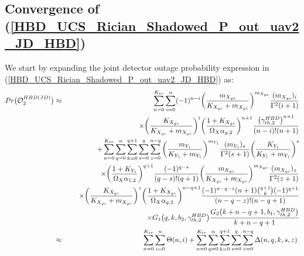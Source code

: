 \subsection{Convergence of (\ref{HBD_UCS_Rician_Shadowed_P_out_uav2_JD_HBD})} \label{HBD_UCS_Rician_Shadowed_P_out_uav2_JD_HBD_conv}
We start by expanding the joint detector outage probability expression in (\ref{HBD_UCS_Rician_Shadowed_P_out_uav2_JD_HBD}) as:
\begin{eqnarray} 
Pr\big(\mathcal{O}_{2}^{HBD(JD)}\big) & \approx & \sum_{n=0}^{K_{tr}} \sum_{i=0}^n (-1)^{n-i} \bigg(\frac{m_{X_{gs}}}{K_{X_{gs}}+m_{X_{gs}}}\bigg)^{m_{X_{gs}}} \frac{(m_{X_{gs}})_i}{\Gamma^2(i+1)} \nonumber\\
 & & \hspace{0.5cm} \times \bigg(\frac{K_{X_{gs}}}{K_{X_{gs}}+m_{X_{gs}}}\bigg)^{i} \bigg(\frac{1+K_{X_{gs}}}{\Omega_X\alpha_{g,2}}\bigg)^{n+1} \frac{\big(\gamma_{th,2}^{HBD}\big)^{n+1}}{(n-i)!(n+1)} \nonumber \\
 & & + \sum_{n=0}^{K_{tr}}\sum_{q=0}^{n}\sum_{k=0}^{q+1} \sum_{s=0}^q \sum_{z=0}^{n-q} \bigg(\frac{m_{Y_1}}{K_{Y_1}+m_{Y_1}}\bigg)^{m_{Y_1}} \frac{(m_{Y_1})_s}{\Gamma^2(s+1)} \bigg(\frac{K_{Y_1}}{K_{Y_1}+m_{Y_1}}\bigg)^{s} \nonumber\\
 & & \hspace{0.5cm} \times \bigg(\frac{1+K_{Y_1}}{\Omega_X\alpha_{1,2}}\bigg)^{q+1} \frac{(-1)^{q-s}}{(q-s)!(q+1)} \bigg(\frac{m_{X_{gs}}}{K_{X_{gs}}+m_{X_{gs}}}\bigg)^{m_{X_{gs}}} \frac{(m_{X_{gs}})_z}{\Gamma^2(z+1)} \nonumber \\
 & & \hspace{0.5cm} \times \bigg(\frac{K_{X_{gs}}}{K_{X_{gs}}+m_{X_{gs}}}\bigg)^{z} \bigg(\frac{1+K_{X_{gs}}}{\Omega_X\alpha_{g,2}}\bigg)^{n-q+1} \frac{(-1)^{n-q-z} (n+1) \binom{q+1}{k}(-1)^{q+1}}{(n-q-z)!(n-q+1)} \nonumber\\
 & & \hspace{0.5cm} \times G_1\big(q,k,b_2,\gamma_{th,2}^{HBD}\big) \frac{G_2\big(k+n-q+1,b_1,\gamma_{th,2}^{HBD}\big)}{k+n-q+1} \nonumber \\
 & \approx & \sum_{n=0}^{K_{tr}} \sum_{i=0}^n \Theta(n,i) + \sum_{n=0}^{K_{tr}}\sum_{q=0}^{n}\sum_{k=0}^{q+1} \sum_{s=0}^q \sum_{z=0}^{n-q} \Delta(n,q,k,s,z)_. \label{HBD_UCS_Rician_Shadowed_P_out_uav2_JD_HBD_conv_proof_eq1}
\end{eqnarray}

